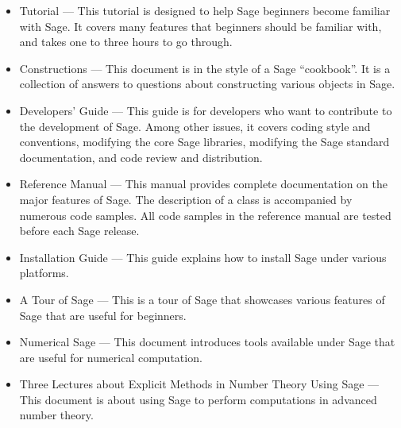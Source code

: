 \begin{itemize}
\item Tutorial --- This tutorial is designed to help Sage beginners
  become familiar with Sage. It covers many features that beginners
  should be familiar with, and takes one to three hours to go through.

\item Constructions --- This document is in the style of a Sage
  ``cookbook''. It is a collection of answers to questions about
  constructing various objects in Sage.

\item Developers' Guide --- This guide is for developers who want to
  contribute to the development of Sage. Among other issues, it covers
  coding style and conventions, modifying the core Sage libraries,
  modifying the Sage standard documentation, and code review and
  distribution.

\item Reference Manual --- This manual provides complete documentation
  on the major features of Sage. The description of a class is
  accompanied by numerous code samples. All code samples in the
  reference manual are tested before each Sage release.

\item Installation Guide --- This guide explains how to install Sage
  under various platforms.

\item A Tour of Sage --- This is a tour of Sage that showcases various
  features of Sage that are useful for beginners.

\item Numerical Sage --- This document introduces tools available
  under Sage that are useful for numerical computation.

\item Three Lectures about Explicit Methods in Number Theory Using
  Sage --- This document is about using Sage to perform computations
  in advanced number theory.
\end{itemize}

